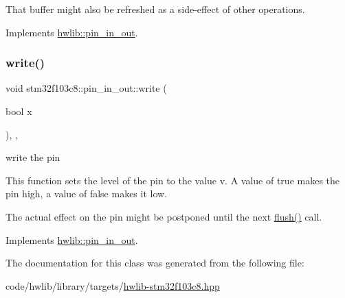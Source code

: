 That buffer might also be refreshed as a side-\/effect of other operations. 

Implements \hyperlink{classhwlib_1_1pin__in__out_a8815baac4e5193ec68795956f5e363a6}{hwlib\+::pin\+\_\+in\+\_\+out}.

\mbox{\label{classstm32f103c8_1_1pin__in__out_ad8ae1c5cbeb418a79de579a3a2386310}} 
\subsubsection{\texorpdfstring{write()}{write()}}
{\footnotesize\ttfamily void stm32f103c8\+::pin\+\_\+in\+\_\+out\+::write (\begin{DoxyParamCaption}\item[{bool}]{x }\end{DoxyParamCaption})\hspace{0.3cm}{\ttfamily [inline]}, {\ttfamily [override]}, {\ttfamily [virtual]}}

write the pin

This function sets the level of the pin to the value v. A value of true makes the pin high, a value of false makes it low.

The actual effect on the pin might be postponed until the next \hyperlink{classstm32f103c8_1_1pin__in__out_aae0b516a0f186e8f6be498af8b1ca238}{flush()} call. 

Implements \hyperlink{classhwlib_1_1pin__in__out_aa5e2adcb5707f86c20b6306fc09f1582}{hwlib\+::pin\+\_\+in\+\_\+out}.



The documentation for this class was generated from the following file\+:\begin{DoxyCompactItemize}
\item 
code/hwlib/library/targets/\hyperlink{hwlib-stm32f103c8_8hpp}{hwlib-\/stm32f103c8.\+hpp}\end{DoxyCompactItemize}
